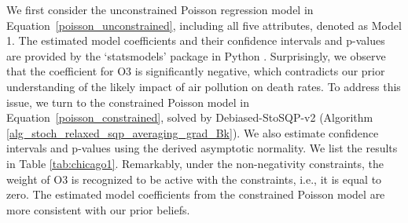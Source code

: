 \documentclass[aos]{imsart}
\numberwithin{equation}{section}
\theoremstyle{plain}
\begin{document}
\begin{table}[h]
  \centering
  \caption{Summary of Poisson regression (Model 2) on Chicago air pollution and death rate data}
\label{tab:chicago2}
    \end{table}


We first consider the unconstrained Poisson regression model in Equation~\eqref{poisson_unconstrained}, including all five attributes, denoted as Model 1. The estimated model coefficients and their confidence intervals and p-values are provided by the `statsmodels' package in Python \cite{seabold2010statsmodels}. Surprisingly, we observe that the coefficient for O3 is significantly negative, which contradicts our prior understanding of the likely impact of air pollution on death rates. To address this issue, we turn to the constrained Poisson model in Equation~\eqref{poisson_constrained}, solved by Debiased-StoSQP-v2 (Algorithm \ref{alg_stoch_relaxed_sqp_averaging_grad_Bk}). 
We also estimate confidence intervals and p-values using the derived asymptotic normality. We list the results in Table \ref{tab:chicago1}. Remarkably, under the non-negativity constraints, the weight of O3 is recognized to be active with the constraints, i.e., it is equal to zero. The estimated model coefficients from the constrained Poisson model are more consistent with our prior beliefs. 
\end{document}
